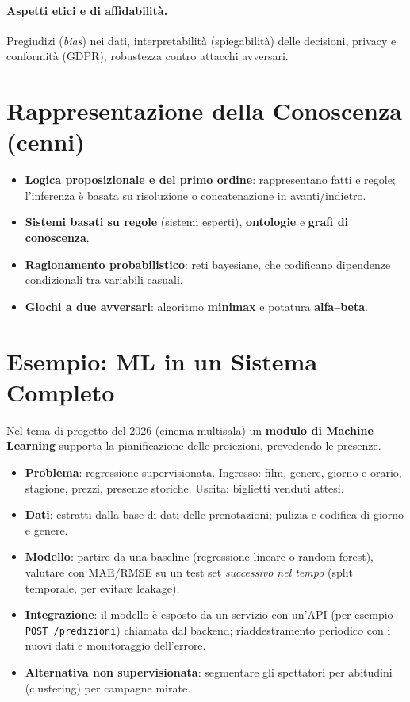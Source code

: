 \paragraph{Aspetti etici e di affidabilità.} Pregiudizi (\emph{bias}) nei dati, interpretabilità (spiegabilità) delle decisioni, privacy e conformità (GDPR), robustezza contro attacchi avversari.

\section{Rappresentazione della Conoscenza (cenni)}
\begin{itemize}
    \item \textbf{Logica proposizionale e del primo ordine}: rappresentano fatti e regole; l'inferenza è basata su risoluzione o concatenazione in avanti/indietro.
    \item \textbf{Sistemi basati su regole} (sistemi esperti), \textbf{ontologie} e \textbf{grafi di conoscenza}.
    \item \textbf{Ragionamento probabilistico}: reti bayesiane, che codificano dipendenze condizionali tra variabili casuali.
    \item \textbf{Giochi a due avversari}: algoritmo \textbf{minimax} e potatura \textbf{alfa--beta}.
\end{itemize}

\section{Esempio: ML in un Sistema Completo}
Nel tema di progetto del 2026 (cinema multisala) un \textbf{modulo di Machine Learning} supporta la pianificazione delle proiezioni, prevedendo le presenze.
\begin{itemize}
    \item \textbf{Problema}: regressione supervisionata. Ingresso: film, genere, giorno e orario, stagione, prezzi, presenze storiche. Uscita: biglietti venduti attesi.
    \item \textbf{Dati}: estratti dalla base di dati delle prenotazioni; pulizia e codifica di giorno e genere.
    \item \textbf{Modello}: partire da una baseline (regressione lineare o random forest), valutare con MAE/RMSE su un test set \emph{successivo nel tempo} (split temporale, per evitare leakage).
    \item \textbf{Integrazione}: il modello è esposto da un servizio con un'API (per esempio \texttt{POST /predizioni}) chiamata dal backend; riaddestramento periodico con i nuovi dati e monitoraggio dell'errore.
    \item \textbf{Alternativa non supervisionata}: segmentare gli spettatori per abitudini (clustering) per campagne mirate.
\end{itemize}

